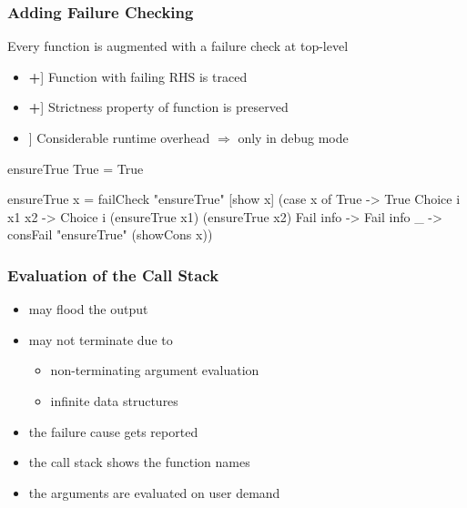 \documentclass[
,hyperref={pdfpagelabels=false}
,xcolor=dvipsnames
]{beamer}
\newcommand{\ergo}{$\Rightarrow$}
\newcommand{\pro}{\makebox[1ex]{\color{Green}\bfseries +}}
\newcommand{\con}{\makebox[1ex]{\color{Red}  \bfseries \textendash}}
\begin{document}
\begin{frame}[fragile]%
\frametitle{Adding Failure Checking}

Every function is augmented with a failure check at top-level

\begin{itemize}
\item[\pro] Function with failing RHS is traced
\item[\pro] Strictness property of function is preserved
\item[\con] Considerable runtime overhead \ergo{} only in debug mode
\end{itemize}

\pause

\begin{curry}
ensureTrue True = True
\end{curry}

\begin{haskell}
ensureTrue x = \alert{failCheck "{}ensureTrue" [show x]} (case x of
  True           -> True
  Choice i x1 x2 -> Choice i (ensureTrue x1) (ensureTrue x2)
  Fail info      -> Fail info
  _              -> consFail "{}ensureTrue" (showCons x))
\end{haskell}
\end{frame}

\begin{frame}[fragile]%
\frametitle{Evaluation of the Call Stack}


\begin{itemize}
\item may flood the output
\item may not terminate due to
\begin{itemize}
 \item non-terminating argument evaluation
 \item infinite data structures
\end{itemize}
\end{itemize}

\pause


\begin{itemize}
\item the failure cause gets reported
  \item the call stack shows the function names
  \item the arguments are evaluated on user demand
\end{itemize}

\end{frame}
\end{document}
